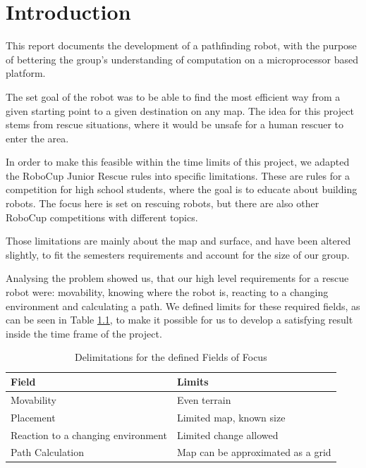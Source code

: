 \chapter{Introduction}\label{ch:introduction}

This report documents the development of a pathfinding robot,
with the purpose of bettering the group's understanding of computation on a microprocessor based platform.

The set goal of the robot was to be able to find the most efficient way
from a given starting point to a given destination on any map.
The idea for this project stems from rescue situations,
where it would be unsafe for a human rescuer to enter the area.

In order to make this feasible within the time limits of this project,
we adapted the RoboCup Junior Rescue rules \cite{Robocup} into specific limitations.
These are rules for a competition for high school students,
where the goal is to educate about building robots.
The focus here is set on rescuing robots,
but there are also other RoboCup competitions with different topics.

Those limitations are mainly about the map and surface,
and have been altered slightly,
to fit the semesters requirements and account for the size of our group.

Analysing the problem showed us,
that our high level requirements for a rescue robot were:
movability,
knowing where the robot is,
reacting to a changing environment and
calculating a path.
We defined limits for these required fields, as can be seen in Table \ref{tab:limits}, to make it possible for us to develop a satisfying result inside the time frame of the project.

\vspace{0.5cm}
\begin{table}[h]
\centering
\caption{Delimitations for the defined Fields of Focus}
\label{tab:limits}
\begin{tabular}{|l|l|}
	\hline%
	Field 				& Limits							\\
	\hline%
	Movability			& Even terrain						\\
	Placement			& Limited map, known size			\\
	Reaction to a changing environment	& Limited change allowed			\\
	Path Calculation	& Map can be approximated as a grid	\\
	\hline%
\end{tabular}
\end{table}

